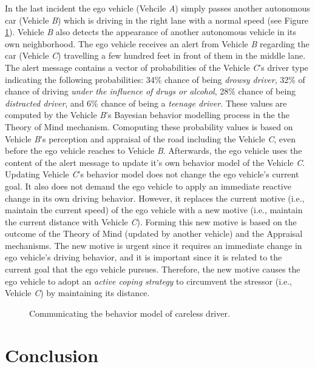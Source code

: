 \documentclass[journal, 11pt]{IEEEtran}
\begin{document}
In the last incident the ego vehicle (Vehcile \textit{A}) simply passes another
autonomous car (Vehicle \textit{B}) which is driving in the right lane with a
normal speed (see Figure \ref{fig:example3}). Vehicle \textit{B} also detects
the appearance of another autonomous vehicle in its own neighborhood. The ego
vehicle receives an alert from Vehicle \textit{B} regarding the car (Vehicle
\textit{C}) travelling a few hundred feet in front of them in the middle lane.
The alert message contains a vector of probabilities of the Vehicle \textit{C}'s
driver type indicating the following probabilities: 34\% chance of being
\textit{drowsy driver}, 32\% of chance of driving \textit{under the influence of
drugs or alcohol}, 28\% chance of being \textit{distracted driver}, and 6\%
chance of being a \textit{teenage driver}. These values are computed by the
Vehicle \textit{B}'s Bayesian behavior modelling process in the the Theory of
Mind mechanism. Comoputing these probability values is based on Vehicle
\textit{B}'s perception and appraisal of the road including the Vehicle
\textit{C}, even before the ego vehicle reaches to Vehicle \textit{B}.
Afterwards, the ego vehicle uses the content of the alert message to update it's
own behavior model of the Vehicle \textit{C}. Updating Vehicle \textit{C}'s
behavior model does not change the ego vehicle's current goal. It also does not
demand the ego vehicle to apply an immediate reactive change in its own driving
behavior. However, it replaces the current motive (i.e., maintain the current
speed) of the ego vehicle with a new motive (i.e., maintain the current distance
with Vehicle \textit{C}). Forming this new motive is based on the outcome of the
Theory of Mind (updated by another vehicle) and the Appraisal mechanisms. The
new motive is urgent since it requires an immediate change in ego vehicle's
driving behavior, and it is important since it is related to the current goal
that the ego vehicle pursues. Therefore, the new motive causes the ego vehicle
to adopt an \textit{active coping strategy} to circumvent the stressor (i.e.,
Vehicle \textit{C}) by maintaining its distance.

\begin{figure}[!t]
  \centerline{}
  \vspace*{-2mm}
  \caption{Communicating the behavior model of careless driver.}
  \label{fig:example3}
  \vspace*{-5mm}
\end{figure}

\section{Conclusion}
\label{Conc}
%



% 
\end{document}
